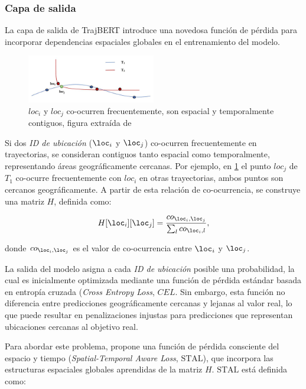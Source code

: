 \subsubsection{Capa de salida}

La capa de salida de TrajBERT introduce una novedosa función de pérdida para incorporar dependencias espaciales globales en el entrenamiento del modelo. 

\begin{figure}[!htb] \centering \includegraphics[width=0.5\textwidth]{Graphics/co_ocurrent_trajectories.jpg} \caption{$loc_i$ y $loc_j$ co-ocurren frecuentemente, son espacial y temporalmente contiguos, figura extraída de \cite{si2023trajbert}} \label{fig:co_ocurrent_trajectories} 
\end{figure}

Si dos \textit{ID de ubicación} (\(\loc_i\) y \(\loc_j\)) co-ocurren frecuentemente en trayectorias, se consideran contiguos tanto espacial como temporalmente, representando áreas geográficamente cercanas. Por ejemplo, en \ref{fig:co_ocurrent_trajectories} el punto $loc_j$ de $T_1$ co-ocurre frecuentemente con $loc_i$ en otras trayectorias, ambos puntos son cercanos geográficamente. A partir de esta relación de co-ocurrencia, se construye una matriz \(H\), definida como:

\begin{equation}
H[\loc_i][\loc_j] = \frac{co_{\loc_i, \loc_j}}{\sum_{l} co_{\loc_i, l}},
\label{eq:co_ocurrence_matrix}
\end{equation}

\noindent
donde \(co_{\loc_i, \loc_j}\) es el valor de co-ocurrencia entre \(\loc_i\) y \(\loc_j\).

La salida del modelo asigna a cada \textit{ID de ubicación} posible una probabilidad, la cual es inicialmente optimizada mediante una función de pérdida estándar basada en entropía cruzada (\textit{Cross Entropy Loss}, \(CEL\). Sin embargo, esta función no diferencia entre predicciones geográficamente cercanas y lejanas al valor real, lo que puede resultar en penalizaciones injustas para predicciones que representan ubicaciones cercanas al objetivo real.

Para abordar este problema, \cite{si2023trajbert} propone una función de pérdida consciente del espacio y tiempo (\textit{Spatial-Temporal Aware Loss}, \(\text{STAL}\)), que incorpora las estructuras espaciales globales aprendidas de la matriz \(H\). \(\text{STAL}\) está definida como:

